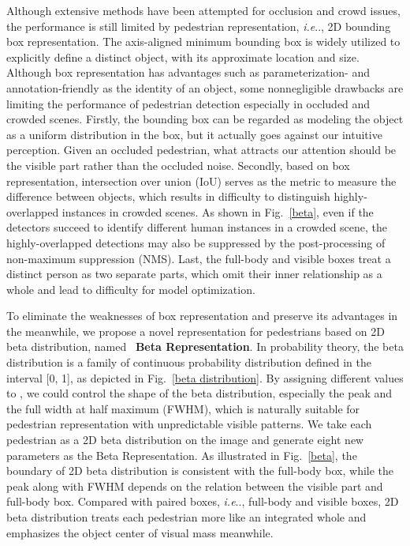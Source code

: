 \documentclass{article}
\makeatletter
\DeclareRobustCommand\onedot{\futurelet\@let@token\@onedot}
\def\@onedot{\ifx\@let@token.\else.\null\fi\xspace}
\def\ie{\emph{i.e}\onedot} \def\Ie{\emph{I.e}\onedot}
\makeatother
\begin{document}
Although extensive methods have been attempted for occlusion and crowd issues, the performance is still limited by pedestrian representation, \ie, 2D bounding box representation.
The axis-aligned minimum bounding box is widely utilized to explicitly define a distinct object, with its approximate location and size.
Although box representation has advantages such as parameterization- and annotation-friendly as the identity of an object, some nonnegligible drawbacks are limiting the performance of pedestrian detection especially in occluded and crowded scenes.
Firstly, the bounding box can be regarded as modeling the object as a uniform distribution in the box, but it actually goes against our intuitive perception. Given an occluded pedestrian, what attracts our attention should be the visible part rather than the occluded noise.
Secondly, based on box representation, intersection over union (IoU) serves as the metric to measure the difference between objects, which results in difficulty to distinguish highly-overlapped instances in crowded scenes.
As shown in Fig.~\ref{beta}, even if the detectors succeed to identify different human instances in a crowded scene, the highly-overlapped detections may also be suppressed by the post-processing of non-maximum suppression (NMS).
Last, the full-body and visible boxes treat a distinct person as two separate parts, which omit their inner relationship as a whole and lead to difficulty for model optimization. 








To eliminate the weaknesses of box representation and preserve its advantages in the meanwhile, we propose a novel representation for pedestrians based on 2D beta distribution, named ~\textbf{Beta Representation}.
In probability theory, the beta distribution is a family of continuous probability distribution defined in the interval [0, 1], as depicted in Fig.~\ref{beta distribution}.
By assigning different values to , we could control the shape of the beta distribution, especially the peak and the full width at half maximum (FWHM), which is naturally suitable for pedestrian representation with unpredictable visible patterns.
We take each pedestrian as a 2D beta distribution on the image and generate eight new parameters as the Beta Representation.
As illustrated in Fig.~\ref{beta}, the boundary of 2D beta distribution is consistent with the full-body box, while the peak along with FWHM depends on the relation between the visible part and full-body box.
Compared with paired boxes, \ie, full-body and visible boxes, 2D beta distribution treats each pedestrian more like an integrated whole and emphasizes the object center of visual mass meanwhile.
\end{document}
